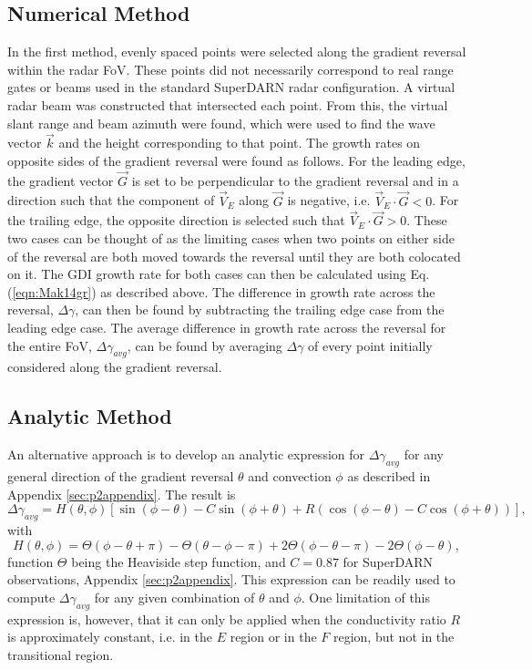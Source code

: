 \subsection{Numerical Method}
\label{sec:numerical}
In the first method, evenly spaced points were selected along the gradient reversal within the radar FoV. These points did not necessarily correspond to real range gates or beams used in the standard SuperDARN radar configuration.  A virtual radar beam was constructed that intersected each point.  From this, the virtual slant range and beam azimuth were found, which were used to find the wave vector \(\vec{k}\) and the height corresponding to that point.  The growth rates on opposite sides of the gradient reversal were found as follows.  For the leading edge, the gradient vector \(\vec{G}\) is set to be perpendicular to the gradient reversal and in a direction such that the component of \(\vec{V}_E\) along \(\vec{G}\) is negative, i.e. \(\vec{V}_E\cdot \vec{G}<0\). For the trailing edge, the opposite direction is selected such that \(\vec{V}_E\cdot \vec{G}>0\). These two cases can be thought of as the limiting cases when two points on either side of the reversal are both moved towards the reversal until they are both colocated on it.  The GDI growth rate for both cases can then be calculated using Eq. (\ref{eqn:Mak14gr}) as described above.  The difference in growth rate across the reversal, \(\Delta\gamma\), can then be found by subtracting the trailing edge case from the leading edge case.  The average difference in growth rate across the reversal for the entire FoV, \(\Delta\gamma_{avg}\), can be found by averaging \(\Delta\gamma\) of every point initially considered along the gradient reversal.



\subsection{Analytic Method}
\label{sec:analytic}

An alternative approach is to develop an analytic expression for \(\Delta\gamma_{avg}\) for any general direction of the gradient reversal \(\theta\) and convection \(\phi\) as described in Appendix \ref{sec:p2appendix}. The result is
\begin{equation}
\label{eqn:gr}
\Delta\gamma_{avg}=H(\theta,\phi)\left[\sin(\phi-\theta)-C\sin(\phi+\theta)+R\left(\cos(\phi-\theta)-C\cos(\phi+\theta)\right)\right], 
\end{equation}
with 
\begin{equation}
\label{eqn:Heaviside}
H(\theta,\phi)=\Theta(\phi-\theta+\pi)-\Theta(\theta-\phi-\pi)+2\Theta(\phi-\theta-\pi)-2\Theta(\phi-\theta),
\end{equation}
function \(\Theta\) being the Heaviside step function, and \(C=0.87\) for SuperDARN observations, Appendix \ref{sec:p2appendix}. This expression can be readily used to compute \(\Delta\gamma_{avg}\) for any given combination of \(\theta\) and \(\phi\). One limitation of this expression is, however, that it can only be applied when the conductivity ratio \(R\) is approximately constant, i.e. in the \(E\) region or in the \(F\) region, but not in the transitional region.



